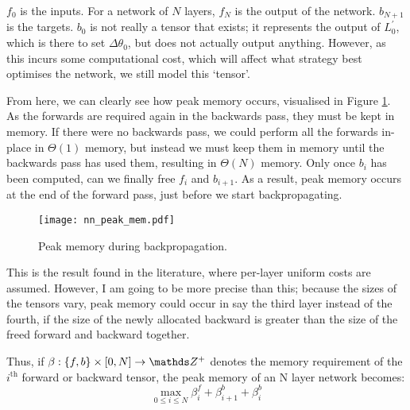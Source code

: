 \(f_0\) is the inputs. For a network of \(N\) layers, \(f_N\) is the output of the network. \(b_{N+1}\) is the targets. \(b_0\) is not really a tensor that exists; it represents the output of \(L^\prime_{0}\), which is there to set \(\Delta\theta_0\), but does not actually output anything. However, as this incurs some computational cost, which will affect what strategy best optimises the network, we still model this `tensor'.

From here, we can clearly see how peak memory occurs, visualised in Figure \ref{fig:2-nn-peak-mem}.
As the forwards are required again in the backwards pass, they must be kept in memory.
If there were no backwards pass, we could perform all the forwards in-place in \(\Theta(1)\) memory, but instead we must keep them in memory until the backwards pass has used them, resulting in \(\Theta(N)\) memory.
Only once \(b_i\) has been computed, can we finally free \(f_i\) and \(b_{i+1}\).
As a result, peak memory occurs at the end of the forward pass, just before we start backpropagating.

\begin{figure}[hp]
    \centering
    \texttt{[image: nn\_peak\_mem.pdf]}
    \caption{Peak memory during backpropagation.}
    \label{fig:2-nn-peak-mem}
\end{figure}

This is the result found in the literature, where per-layer uniform costs are assumed.
However, I am going to be more precise than this;
because the sizes of the tensors vary, peak memory could occur in say the third layer instead of the fourth, if the size of the newly allocated backward is greater than the size of the freed forward and backward together.

Thus, if \(\beta : \{f, b\}\times[0, N] \rightarrow \Z^+\) denotes the memory requirement of the \(i^{\mathrm{th}}\) forward or backward tensor, the peak memory of an N layer network becomes:
\begin{equation}
    \label{eqn:2-nn-peak-mem}
    \max_{0 \leq i \leq N} \beta^f_i + \beta^b_{i+1} + \beta^b_i
\end{equation}
